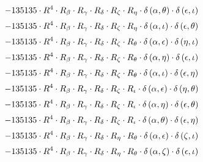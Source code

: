 \begin{subequations}
\begin{gather}
 \\[0.2em] \notag 		 - 135135 \cdot R^{4} \cdot R_{\beta{}} \cdot R_{\gamma{}} \cdot R_{\delta{}} \cdot R_{\zeta{}} \cdot R_{\eta{}} \cdot \delta{}\left(\alpha{}, \theta{}\right) \cdot \delta{}\left(\epsilon{}, \iota{}\right) 
 \\[0.2em] \notag 		 - 135135 \cdot R^{4} \cdot R_{\beta{}} \cdot R_{\gamma{}} \cdot R_{\delta{}} \cdot R_{\zeta{}} \cdot R_{\eta{}} \cdot \delta{}\left(\alpha{}, \iota{}\right) \cdot \delta{}\left(\epsilon{}, \theta{}\right) 
 \\[0.2em] \notag 		 - 135135 \cdot R^{4} \cdot R_{\beta{}} \cdot R_{\gamma{}} \cdot R_{\delta{}} \cdot R_{\zeta{}} \cdot R_{\theta{}} \cdot \delta{}\left(\alpha{}, \epsilon{}\right) \cdot \delta{}\left(\eta{}, \iota{}\right) 
 \\[0.2em] \notag 		 - 135135 \cdot R^{4} \cdot R_{\beta{}} \cdot R_{\gamma{}} \cdot R_{\delta{}} \cdot R_{\zeta{}} \cdot R_{\theta{}} \cdot \delta{}\left(\alpha{}, \eta{}\right) \cdot \delta{}\left(\epsilon{}, \iota{}\right) 
 \\[0.2em] \notag 		 - 135135 \cdot R^{4} \cdot R_{\beta{}} \cdot R_{\gamma{}} \cdot R_{\delta{}} \cdot R_{\zeta{}} \cdot R_{\theta{}} \cdot \delta{}\left(\alpha{}, \iota{}\right) \cdot \delta{}\left(\epsilon{}, \eta{}\right) 
 \\[0.2em] \notag 		 - 135135 \cdot R^{4} \cdot R_{\beta{}} \cdot R_{\gamma{}} \cdot R_{\delta{}} \cdot R_{\zeta{}} \cdot R_{\iota{}} \cdot \delta{}\left(\alpha{}, \epsilon{}\right) \cdot \delta{}\left(\eta{}, \theta{}\right) 
 \\[0.2em] \notag 		 - 135135 \cdot R^{4} \cdot R_{\beta{}} \cdot R_{\gamma{}} \cdot R_{\delta{}} \cdot R_{\zeta{}} \cdot R_{\iota{}} \cdot \delta{}\left(\alpha{}, \eta{}\right) \cdot \delta{}\left(\epsilon{}, \theta{}\right) 
 \\[0.2em] \notag 		 - 135135 \cdot R^{4} \cdot R_{\beta{}} \cdot R_{\gamma{}} \cdot R_{\delta{}} \cdot R_{\zeta{}} \cdot R_{\iota{}} \cdot \delta{}\left(\alpha{}, \theta{}\right) \cdot \delta{}\left(\epsilon{}, \eta{}\right) 
 \\[0.2em] \notag 		 - 135135 \cdot R^{4} \cdot R_{\beta{}} \cdot R_{\gamma{}} \cdot R_{\delta{}} \cdot R_{\eta{}} \cdot R_{\theta{}} \cdot \delta{}\left(\alpha{}, \epsilon{}\right) \cdot \delta{}\left(\zeta{}, \iota{}\right) 
 \\[0.2em] \notag 		 - 135135 \cdot R^{4} \cdot R_{\beta{}} \cdot R_{\gamma{}} \cdot R_{\delta{}} \cdot R_{\eta{}} \cdot R_{\theta{}} \cdot \delta{}\left(\alpha{}, \zeta{}\right) \cdot \delta{}\left(\epsilon{}, \iota{}\right) 

\end{gather}
\end{subequations}
